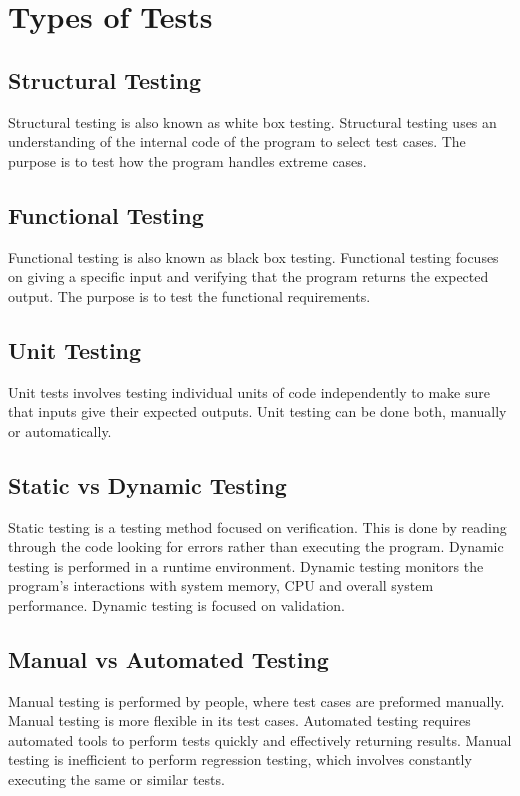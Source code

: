 \documentclass[12pt]{article}
\begin{document}
\section{Types of Tests}

\subsection{Structural Testing}
Structural testing is also known as white box testing. Structural testing 
uses an understanding of the internal code of the program to select test cases. 
The purpose is to test how the program handles extreme cases.

\subsection{Functional Testing}
Functional testing is also known as black box testing. Functional testing 
focuses on giving a specific input and verifying that the program returns the 
expected output. The purpose is to test the functional requirements.

\subsection{Unit Testing}
Unit tests involves testing individual units of code independently to make sure 
that inputs give their expected outputs. Unit testing can be done both,  
manually or automatically.

\subsection{Static vs Dynamic Testing}
Static testing is a testing method focused on verification. This is done by 
reading through the code looking for errors rather than executing the program.
Dynamic testing is performed in a runtime environment. Dynamic testing monitors 
the program's interactions with system memory, CPU and overall system  
performance. Dynamic testing is focused on validation.

\subsection{Manual vs Automated Testing}
Manual testing is performed by people, where test cases are preformed manually. 
Manual testing is more flexible in its test cases. Automated testing 
requires automated tools to perform tests quickly and effectively returning 
results. Manual testing is inefficient to perform regression testing, which 
involves constantly executing the same or similar tests.
\end{document}
